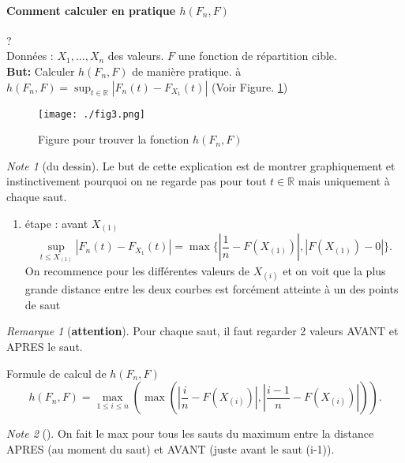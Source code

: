 \documentclass{article}
\theoremstyle{plain}%
\theoremstyle{definition}
\theoremstyle{remark}
\newtheorem*{rem}{Remarque}
\newtheorem*{note}{Note}
\begin{document}
\paragraph{Comment calculer en pratique $ h(F_n,F) $} ? \\ 

Données : $ X_1, \dots, X_n $ des valeurs. $ F $ une fonction de répartition cible. \\
\textbf{But:} Calculer $ h(F_n,F) $ de manière pratique. à $ h(F_n, F) = \sup_{t \in \mathbb{R}} \left| F_n(t) - F_{X_1}(t) \right| $ (Voir Figure. \ref{fig3})

\begin{figure}[!htbp]
    \centering
    \texttt{[image: ./fig3.png]}
    \caption{Figure pour trouver la fonction $ h(F_n, F) $ }
    \label{fig3}
\end{figure}
\begin{note}[du dessin]
    Le but de cette explication est de montrer graphiquement et instinctivement pourquoi on ne regarde pas pour tout $ t \in \mathbb{R} $ mais uniquement à chaque saut.
\end{note}

\begin{enumerate}
    \item étape : avant $ X_(1) $ 
    \[
        \sup_{t \leq X_{(1)}} \left| F_n(t) - F_{X_1}(t) \right| = \max \{ \left| \frac{1}{n} - F(X_{(1)}) \right| , \left| F(X_{(1)}) - 0 \right| \}
    .\]
    On recommence pour les différentes valeurs de $ X_{(i)} $ et on voit que la plus grande distance entre les deux courbes est forcément atteinte à un des points de saut
\end{enumerate}

\begin{rem}[\textbf{attention}]
    Pour chaque saut, il faut regarder 2 valeurs AVANT et APRES le saut.
\end{rem}

Formule de calcul de $ h(F_n, F) $ 
\[
    h(F_n, F) = \max _{1 \leq i \leq n} ( \max ( \left| \frac{i}{n} - F(X_{(i)}) \right| , \left| \frac{i-1}{n}- F(X_{(i)}) \right|  ))
.\]
\begin{note}[]
    On fait le max pour tous les sauts du maximum entre la distance APRES (au moment du saut) et AVANT (juste avant le saut (i-1)).
\end{note}
\end{document}
